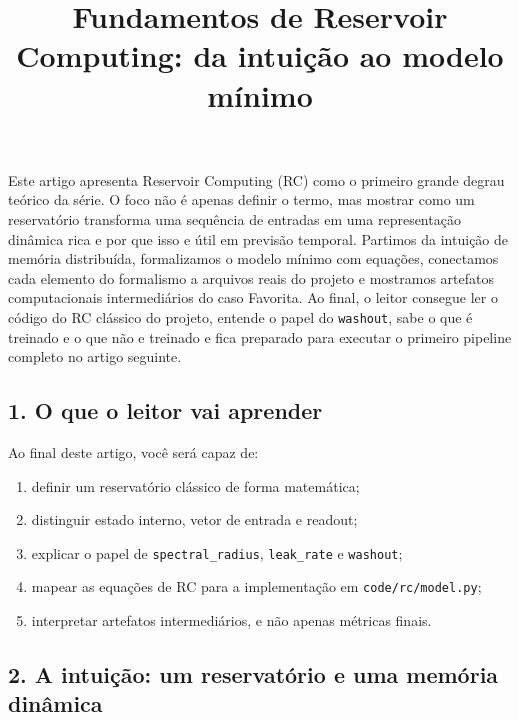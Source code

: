 \documentclass[12pt]{article}
\title{Fundamentos de Reservoir Computing: da intuição ao modelo mínimo}
\author{}
\providecommand{\tightlist}{%
          \setlength{\itemsep}{0pt}\setlength{\parskip}{0pt}}
\begin{document}
        \maketitle

        \begin{resumo}
        Este artigo apresenta Reservoir Computing (RC) como o primeiro grande degrau teórico da série. O foco não é apenas definir o termo, mas mostrar como um reservatório transforma uma sequência de entradas em uma representação dinâmica rica e por que isso e útil em previsão temporal. Partimos da intuição de memória distribuída, formalizamos o modelo mínimo com equações, conectamos cada elemento do formalismo a arquivos reais do projeto e mostramos artefatos computacionais intermediários do caso Favorita. Ao final, o leitor consegue ler o código do RC clássico do projeto, entende o papel do \texttt{washout}, sabe o que é treinado e o que não e treinado e fica preparado para executar o primeiro pipeline completo no artigo seguinte.
        \end{resumo}

        \subsection{1. O que o leitor vai aprender}\label{1-o-que-o-leitor-vai-aprender}

Ao final deste artigo, você será capaz de:

\begin{enumerate}
\def\labelenumi{\arabic{enumi}.}
\tightlist
\item
  definir um reservatório clássico de forma matemática;
\item
  distinguir estado interno, vetor de entrada e readout;
\item
  explicar o papel de \texttt{spectral\_radius}, \texttt{leak\_rate} e \texttt{washout};
\item
  mapear as equações de RC para a implementação em \texttt{code/rc/model.py};
\item
  interpretar artefatos intermediários, e não apenas métricas finais.
\end{enumerate}

\subsection{2. A intuição: um reservatório e uma memória dinâmica}\label{2-a-intuiuxe7uxe3o-um-reservatuxf3rio-e-uma-memuxf3ria-dinuxe2mica}
\end{document}
